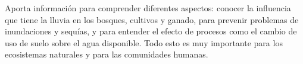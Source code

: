 Aporta información para comprender diferentes aspectos: conocer la influencia que tiene la lluvia en los bosques, cultivos y ganado, para prevenir problemas de inundaciones y sequías, y para entender el efecto de procesos como el cambio de uso de suelo sobre el agua disponible. Todo esto es muy importante para los ecosistemas naturales y para las comunidades humanas.














